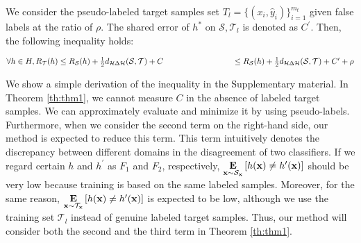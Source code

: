 \documentclass{article}
\begin{document}
We consider the pseudo-labeled target samples set $T_{l}=\bigl\{(x_i,\hat{y}_i)\bigr\}^{m_t}_{i=1}$ given false labels at the ratio of $\rho$. The shared error of $h^{*}$ on $\mathcal{S},\mathcal{T}_{l}$ is denoted as $C^{\prime}$. Then, the following inequality holds: 

\begin{math}
\forall h  \in H, R_{\mathcal{T}}(h) \leq R_{\mathcal{S}}(h)  +\frac{1}{2}{d_{\mathcal{H} \Delta \mathcal{H}}(\mathcal{S},\mathcal{T})}+C\\\\
						   \ \ \ \ \ \ \ \ \ \ \ \ \ \ \ \ \ \ \ \ \ \ \ \ \ \ \leq	R_{\mathcal{S}}(h)  +\frac{1}{2}{d_{\mathcal{H} \Delta \mathcal{H}}(\mathcal{S},\mathcal{T})}+C^{\prime}+\rho
\end{math}

We show a simple derivation of the inequality in the Supplementary material.
In Theorem \ref{th:thm1}, we cannot measure $C$ in the absence of labeled target samples. We can approximately evaluate and minimize it by using pseudo-labels. Furthermore, when we consider the second term on the right-hand side, our method is expected to reduce this term. This term intuitively denotes the discrepancy between different domains in the disagreement of two classifiers. If we regard certain $h$ and $h^{\prime}$ as $F_1$ and $F_2$, respectively, $\underset{{\bf x}\sim \mathcal{S}_{{\bf x}}}{\mathbf{E}} \left[h({\bf x}) \neq h^{\prime}({\bf x}) \right]$ should be very low because training is based on the same labeled samples. Moreover, for the same reason, $\underset{{\bf x}\sim \mathcal{T}_{{\bf x}}}{\mathbf{E}} \left[h({\bf x}) \neq h^{\prime}({\bf x}) \right]$ is expected to be low, although we use the training set $\mathcal{T}_{l}$ instead of genuine labeled target samples. Thus, our method will consider both the second and the third term in Theorem \ref{th:thm1}.
\end{document}
